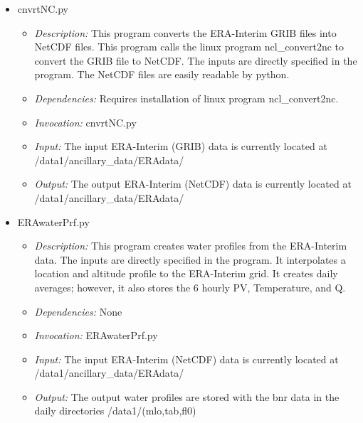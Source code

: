 \documentclass[12pt, letterpaper]{article}
\begin{document}
\begin{itemize}
\item cnvrtNC.py
\begin{itemize}
\item \textit{Description:} This program converts the ERA-Interim GRIB files into NetCDF files. This program calls the linux program ncl\_convert2nc to convert the GRIB file to NetCDF. The inputs are directly specified in the program. The NetCDF files are easily readable by python.
\item \textit{Dependencies:} Requires installation of linux program ncl\_convert2nc.
\item \textit{Invocation:} cnvrtNC.py
\item \textit{Input:} The input ERA-Interim (GRIB) data is currently located at /data1/ancillary\_data/ERAdata/
\item \textit{Output:} The output ERA-Interim (NetCDF) data is currently located at /data1/ancillary\_data/ERAdata/
\end{itemize}
\end{itemize}

\begin{itemize}
\item ERAwaterPrf.py
\begin{itemize}
\item \textit{Description:} This program creates water profiles from the ERA-Interim data. The inputs are directly specified in the program. It interpolates a location and altitude profile to the ERA-Interim grid. It creates daily averages; however, it also stores the 6 hourly PV, Temperature, and Q.
\item \textit{Dependencies:} None
\item \textit{Invocation:} ERAwaterPrf.py
\item \textit{Input:} The input ERA-Interim (NetCDF) data is currently located at /data1/ancillary\_data/ERAdata/
\item \textit{Output:} The output water profiles are stored with the bnr data in the daily directories /data1/(mlo,tab,fl0)
\end{itemize}
\end{itemize}
\end{document}
